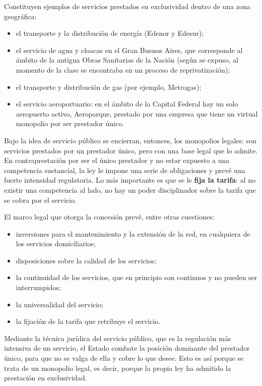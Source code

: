 \documentclass[12pt,oneside]{book}
\begin{document}
Constituyen ejemplos de servicios prestados en exclusividad dentro de una zona geográfica:
\begin{itemize}
    \item el transporte y la distribución de energía (Edenor y Edesur);
    \item el servicio de agua y cloacas en el Gran Buenos Aires, que corresponde al ámbito de la antigua Obras Sanitarias de la Nación (según se expuso, al momento de la clase se encontraba en un proceso de reprivatización);
    \item el transporte y distribución de gas (por ejemplo, Metrogas);
    \item el servicio aeroportuario: en el ámbito de la Capital Federal hay un solo aeropuerto activo, Aeroparque, prestado por una empresa que tiene un virtual monopolio por ser prestador único.
\end{itemize}

Bajo la idea de servicio público se encierran, entonces, los monopolios legales: son servicios prestados por un prestador único, pero con una base legal que lo admite. En contraprestación por ser el único prestador y no estar expuesto a una competencia sustancial, la ley le impone una serie de obligaciones y prevé una fuerte intensidad regulatoria. Lo más importante es que se le \textbf{fija la tarifa}: al no existir una competencia al lado, no hay un poder disciplinador sobre la tarifa que se cobra por el servicio.

El marco legal que otorga la concesión prevé, entre otras cuestiones:
\begin{itemize}
    \item inversiones para el mantenimiento y la extensión de la red, en cualquiera de los servicios domiciliarios;
    \item disposiciones sobre la calidad de los servicios;
    \item la continuidad de los servicios, que en principio son continuos y no pueden ser interrumpidos;
    \item la universalidad del servicio;
    \item la fijación de la tarifa que retribuye el servicio.
\end{itemize}

Mediante la técnica jurídica del servicio público, que es la regulación más intensiva de un servicio, el Estado combate la posición dominante del prestador único, para que no se valga de ella y cobre lo que desee. Esto es así porque se trata de un monopolio legal, es decir, porque la propia ley ha admitido la prestación en exclusividad.
\end{document}
